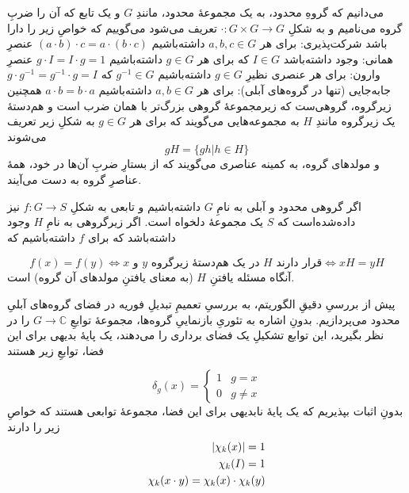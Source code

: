 می‌دانیم که گروهِ محدود، به یک مجموعهٔ محدود، مانندِ \(G\) و یک تابع که آن را ضربِ گروه می‌نامیم و به شکلِ 
\(\cdot: G \times G \to G\)
تعریف می‌شود می‌گوییم که خواصِ زیر را دارا باشد
 شرکت‌پذیری: برای هر \(a, b, c \in G\) داشته‌باشیم 
\((a \cdot b) \cdot c = a \cdot (b \cdot c)\)
 عنصرِ همانی: وجود داشته‌باشد \(I \in G\) که برای هر \(g \in G\) داشته‌باشیم
\(g \cdot I = I \cdot g = 1\)
 عنصرِ وارون: برای هر عنصری نظیرِ \(g \in G\) داشته‌باشیم 
\(g^{-1} \in G\)
که  
\(g \cdot g^{-1} = g^{-1} \cdot g = I\)
 جابه‌جایی (تنها در گروه‌های آبلی): برای هر \(a, b \in G\) داشته‌باشیم
\(a \cdot b = b \cdot a\) 
همچنین زیرگروه، گروهی‌ست که زیرمجموعهٔ گروهی بزرگ‌تر با همان ضرب است و هم‌دستهٔ یک زیرگروه مانندِ \(H\) به مجموعه‌هایی می‌گویند که برای هر \(g \in G\) به شکلِ زیر تعریف می‌شوند
\begin{equation}
    gH = \{gh | h \in H\}
\end{equation}
و مولد‌های گروه، به کمینه عناصری می‌گویند که از بستارِ ضربِ آن‌ها در خود، همهٔ عناصرِ گروه به دست می‌آیند.

اگر گروهی محدود و آبلی به نامِ \(G\) داشته‌باشیم و تابعی به شکلِ
\(f : G \to S\)
نیز داده‌شده‌است که \(S\) یک مجموعهٔ دلخواه است.
اگر زیرگروهی به نامِ \(H\) وجود داشته‌باشد که برای \(f\) داشته‌باشیم که

\begin{equation}
    f(x) = f(y) \Leftrightarrow \text{\(x\) و \(y\) در یک هم‌دستهٔ زیرگروه \(H\) قرار دارند} \Leftrightarrow xH = yH
\end{equation}
آنگاه مسئله یافتنِ \(H\) (به معنای یافتنِ مولدهای آن گروه) است.

پیش از بررسیِ دقیقِ الگوریتم، به بررسیِ تعمیمِ تبدیلِ فوریه در فضای گروه‌های آبلیِ محدود می‌پردازیم. بدونِ اشاره به تئوریِ بازنماییِ گروه‌ها، مجموعهٔ توابعِ 
\(G \to \mathbb{C}\)
را در نظر بگیرید، این توابع تشکیلِ یک فضای برداری را می‌دهند، یک پایهٔ بدیهی برای این فضا، توابعِ زیر هستند

\begin{equation}
    \delta_g(x) = \begin{cases}
    1 & g=x \\
    0 & g \ne x
    \end{cases}
\end{equation}
بدونِ اثبات بپذیریم که یک پایهٔ نابدیهی برای این فضا، مجموعهٔ توابعی هستند که خواصِ زیر را دارند 
\begin{eqnarray}
    \abs{\chi_k(x)} = 1 \\
    \chi_k(I) = 1 \\
    \chi_k(x \cdot y) = \chi_k(x) \cdot \chi_k(y) 
\end{eqnarray}

